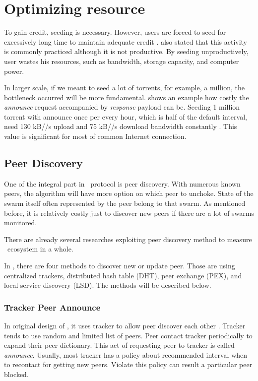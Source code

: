 \section{Optimizing resource}
To gain credit, seeding is necessary. However, users are forced to seed for excessively long time to maintain adequate credit \cite{2013:survivepriv:jia}. \citeauthor{2013:survivepriv:jia} also stated that this activity is commonly practiced although it is not productive. By seeding unproductively, user wastes his resources, such as bandwidth, storage capacity, and computer power.

In larger scale, if we meant to seed a lot of torrents, for example, a million, the bottleneck occurred will be more fundamental. \citeauthor{2012:milliontorrent:arvid} shows an example how costly the \textit{announce} request accompanied by \textit{response} payload can be. Seeding 1 million torrent with announce once per every hour, which is half of the default interval, need 130 kB//s upload and 75 kB//s download bandwidth constantly \cite{2012:milliontorrent:arvid}. This value is significant for most of common Internet connection.

\subsection{Peer Discovery}
One of the integral part in \bt~protocol is peer discovery. With numerous known peers, the algorithm will have more option on which peer to unchoke. State of the swarm itself often represented by the peer belong to that swarm. As mentioned before, it is relatively costly just to discover new peers if there are a lot of swarms monitored. 

There are already several researches exploiting peer discovery method to measure \bt~ecosystem in a whole. 

In \bt, there are four methods to discover new or update peer. Those are using centralized trackers, distributed hash table (DHT), peer exchange (PEX), and local service discovery (LSD). The methods will be described below.

\subsubsection{Tracker Peer Announce}
In original design of \bt, it uses tracker to allow peer discover each other \cite{2003:bittorrent:cohen}. Tracker tends to use random and limited list of peers. Peer contact tracker periodically to expand their peer dictionary. This act of requesting peer to tracker is called \textit{announce}.	Usually, most tracker has a policy about recommended interval when to recontact for getting new peers. Violate this policy can result a particular peer blocked.	
	
